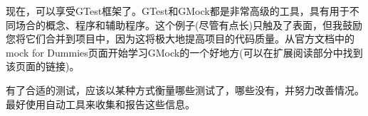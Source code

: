 现在，可以享受GTest框架了。GTest和GMock都是非常高级的工具，具有用于不同场合的概念、程序和辅助程序。这个例子(尽管有点长)只触及了表面，但我鼓励您将它们合并到项目中，因为这将极大地提高项目的代码质量。从官方文档中的mock for Dummies页面开始学习GMock的一个好地方(可以在扩展阅读部分中找到该页面的链接)。

有了合适的测试，应该以某种方式衡量哪些测试了，哪些没有，并努力改善情况。最好使用自动工具来收集和报告这些信息。

